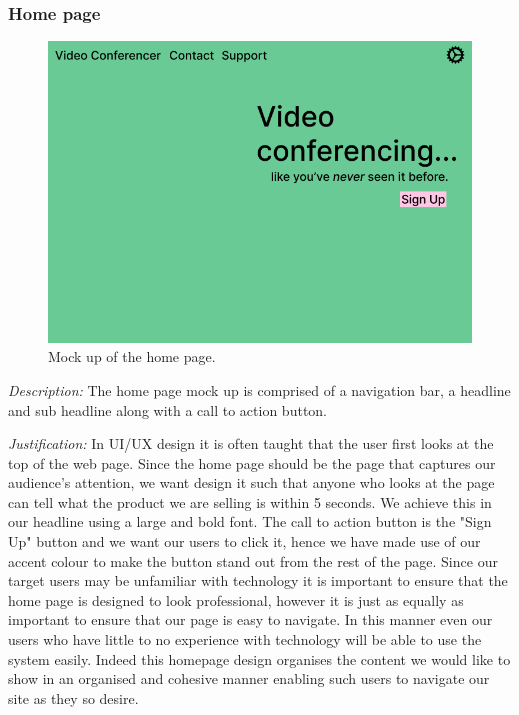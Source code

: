 \subsubsection{Home page}

\begin{figure}[H]
\centering

\includegraphics[scale=0.2]{Images/HomeUI_1.png}

\caption{Mock up of the home page.}
\label{fig:ui1}
\end{figure}

\textit{Description:}
The home page mock up is comprised of a navigation bar, a 
headline and sub headline along with a call to action button.
\\ \vspace{0.2cm}

\textit{Justification:}
In UI/UX design it is often taught that the user first looks 
at the top of the web page. Since the home page should be the 
page that captures our audience's attention, we want design 
it such that anyone who looks at the page can tell what the 
product we are selling is within 5 seconds. We achieve this 
in our headline using a large and bold font. The call to
action button is the "Sign Up" button and we want our users 
to click it, hence we have made use of our accent colour to 
make the button stand out from the rest of the page.  Since
our target users may be unfamiliar with technology it is
important to ensure that the home page is designed to look 
professional, however it is just as equally as important to 
ensure that our page is easy to navigate. In this manner
even our users who have little to no experience with 
technology will be able to use the system easily. Indeed
this homepage design organises the content we would like to 
show in an organised and cohesive manner enabling such users
to navigate our site as they so desire. \\

